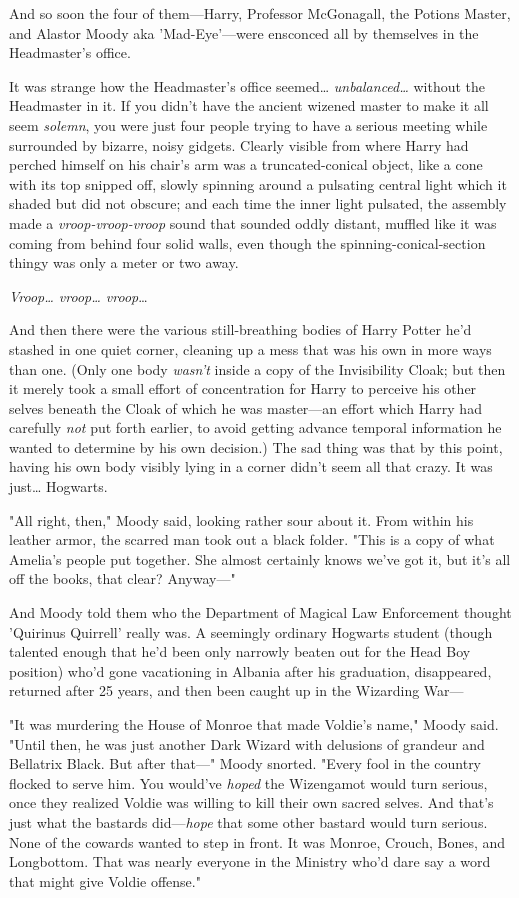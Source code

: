 And so soon the four of them---Harry, Professor McGonagall, the Potions Master, and Alastor Moody aka 'Mad-Eye'---were ensconced all by themselves in the Headmaster's office.

It was strange how the Headmaster's office seemed{\ldots} \emph{unbalanced{\ldots}} without the Headmaster in it. If you didn't have the ancient wizened master to make it all seem \emph{solemn}, you were just four people trying to have a serious meeting while surrounded by bizarre, noisy gidgets. Clearly visible from where Harry had perched himself on his chair's arm was a truncated-conical object, like a cone with its top snipped off, slowly spinning around a pulsating central light which it shaded but did not obscure; and each time the inner light pulsated, the assembly made a \emph{vroop-vroop-vroop} sound that sounded oddly distant, muffled like it was coming from behind four solid walls, even though the spinning-conical-section thingy was only a meter or two away.

\emph{Vroop{\ldots} vroop{\ldots} vroop}{\ldots}

And then there were the various still-breathing bodies of Harry Potter he'd stashed in one quiet corner, cleaning up a mess that was his own in more ways than one. (Only one body \emph{wasn't} inside a copy of the Invisibility Cloak; but then it merely took a small effort of concentration for Harry to perceive his other selves beneath the Cloak of which he was master---an effort which Harry had carefully \emph{not} put forth earlier, to avoid getting advance temporal information he wanted to determine by his own decision.) The sad thing was that by this point, having his own body visibly lying in a corner didn't seem all that crazy. It was just{\ldots} Hogwarts.

"All right, then," Moody said, looking rather sour about it. From within his leather armor, the scarred man took out a black folder. "This is a copy of what Amelia's people put together. She almost certainly knows we've got it, but it's all off the books, that clear? Anyway---"

And Moody told them who the Department of Magical Law Enforcement thought 'Quirinus Quirrell' really was. A seemingly ordinary Hogwarts student (though talented enough that he'd been only narrowly beaten out for the Head Boy position) who'd gone vacationing in Albania after his graduation, disappeared, returned after 25 years, and then been caught up in the Wizarding War---

"It was murdering the House of Monroe that made Voldie's name," Moody said. "Until then, he was just another Dark Wizard with delusions of grandeur and Bellatrix Black. But after that---" Moody snorted. "Every fool in the country flocked to serve him. You would've \emph{hoped} the Wizengamot would turn serious, once they realized Voldie was willing to kill their own sacred selves. And that's just what the bastards did---\emph{hope} that some other bastard would turn serious. None of the cowards wanted to step in front. It was Monroe, Crouch, Bones, and Longbottom. That was nearly everyone in the Ministry who'd dare say a word that might give Voldie offense."

